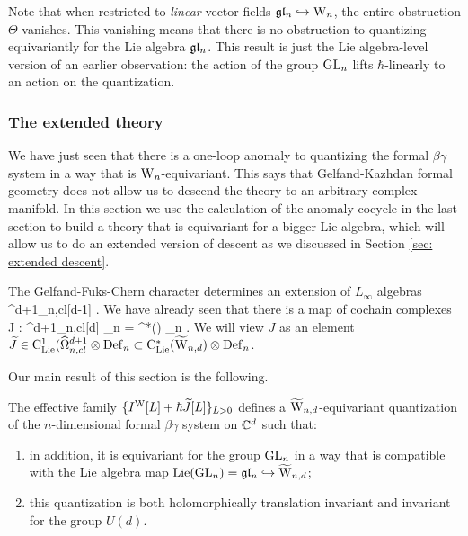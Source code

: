 \begin{rmk} 
Note that when restricted to {\em linear} vector fields $\gl_n \hookrightarrow \Vect$, 
the entire obstruction $\Theta$ vanishes. 
This vanishing means that there is no obstruction to quantizing equivariantly for the Lie algebra $\gl_n$. 
This result is just the Lie algebra-level version of an earlier observation: 
the action of the group $\GL_n$ lifts $\hbar$-linearly to an action on the quantization.
\end{rmk}

\subsubsection{The extended theory}

We have just seen that there is a one-loop anomaly to quantizing the formal $\beta\gamma$ system in a way that is $\Vect$-equivariant. 
This says that Gelfand-Kazhdan formal geometry does not allow us to descend the theory to an arbitrary complex manifold. 
In this section we use the calculation of the anomaly cocycle in the last section to build a theory that is equivariant for a bigger Lie algebra, which will allow us to do an extended version of descent as we discussed in Section \ref{sec: extended descent}. 

The Gelfand-Fuks-Chern character determines an extension of $L_\infty$ algebras
 \to \hOmega^{d+1}_{n,cl}[d-1] \to \TVectd {} \Vect {} .
\een
We have already seen that there is a map of cochain complexes
\ben
J : \hOmega^{d+1}_{n,cl}[d] \to \Def_{n} = \clie^*(\Vect) \tensor \Def_n .
\een
We will view $J$ as an element $\Tilde{J} \in \clie^1(\hOmega^{d+1}_{n,cl} \tensor \Def_n \subset \clie^*(\TVectd) \tensor \Def_n$.

Our main result of this section is the following. 

\begin{thm}\label{thm: extended quantization}
The effective family $\{I^{\rm W}[L] + \hbar \Tilde{J} [L]\}_{L>0}$ defines a $\TVectd$-equivariant quantization of the $n$-dimensional formal $\beta\gamma$ system on $\CC^d$ such that:
\begin{enumerate}
\item in addition, it is equivariant for the group $\GL_n$ in a way that is compatible with the Lie algebra map ${\rm Lie}(\GL_n) = \gl_n \hookrightarrow \TVectd$;
\item this quantization is both holomorphically translation invariant and invariant for the group $U(d)$.
\end{enumerate}
\end{thm}

